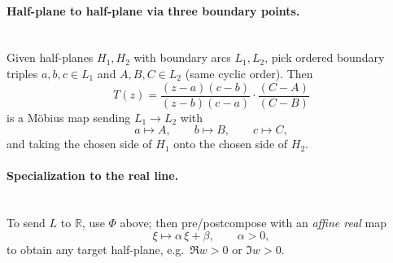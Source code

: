 \documentclass[11pt]{article}
\begin{document}
\medskip

\paragraph{Half-plane to half-plane via three boundary points.}\mbox{}\\[2pt]
Given half-planes $H_1,H_2$ with boundary arcs $L_1,L_2$,
pick ordered boundary triples $a,b,c\in L_1$ and $A,B,C\in L_2$ (same cyclic order).
Then
\[
T(z)=\frac{(z-a)(c-b)}{(z-b)(c-a)}\cdot\frac{(C-A)}{(C-B)}
\]
is a Möbius map sending $L_1\!\to L_2$ with
\[
a\mapsto A,\qquad b\mapsto B,\qquad c\mapsto C,
\]
and taking the chosen side of $H_1$ onto the chosen side of $H_2$.

\medskip

\paragraph{Specialization to the real line.}\mbox{}\\[2pt]
To send $L$ to $\mathbb R$, use $\Phi$ above; then pre/postcompose with an \emph{affine real} map
\[
\xi\longmapsto \alpha\,\xi+\beta,\qquad \alpha>0,
\]
to obtain any target half-plane, e.g.\ $\Re w>0$ or $\Im w>0$.

	
	
\end{document}
